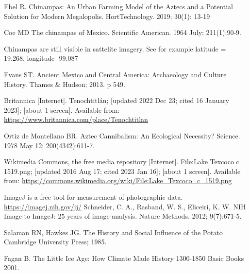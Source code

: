 \documentclass[12pt]{iopart}
\begin{document}
\begin{thebibliography}{99}
Ebel R.
Chinampas: An Urban Farming Model of the Aztecs and a Potential Solution for Modern Megalopolis.
HortTechnology.
2019; 30(1): 13-19

Coe MD
The chinampas of Mexico.
Scientific American.
1964 July; 211(1):90-9.

Chinampas are still visible in sattelite imagery.  See for example latitude = 19.268, longitude -99.087

Evans ST.
Ancient Mexico and Central America: Archaeology and Culture History. 
Thames \& Hudson; 2013. 
p 549.

Britannica [Internet].
Tenochtitlán;
[updated 2022 Dec 23; cited 16 January 2023]; [about 1 screen].
Available from: \url{https://www.britannica.com/place/Tenochtitlan}

Ortiz de Montellano BR.
Aztec Cannibalism: An Ecological Necessity?
Science.
1978 May 12; 
200(4342):611-7.

Wikimedia Commons, the free media repository [Internet].
File:Lake Texcoco c 1519.png;
[updated 2016 Aug 17; cited 2023 Jan 16]; [about 1 screen].
Available from: \url{https://commons.wikimedia.org/wiki/File:Lake\_Texcoco\_c\_1519.png}


ImageJ is a free tool for measurement of photographic data.  
\url{https://imagej.nih.gov/ij/}
Schneider, C. A., Rasband, W. S., Eliceiri, K. W. 
NIH Image to ImageJ: 25 years of image analysis. 
Nature Methods.
2012; 
9(7):671-5. 

Salaman RN, Hawkes JG.
The History and Social Influence of the Potato
Cambridge University Press; 1985.

Fagan B.
The Little Ice Age: How Climate Made History 1300-1850
Basic Books 
2001.


\end{thebibliography}
\end{document}
